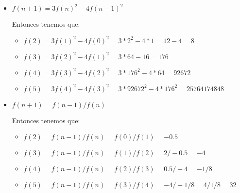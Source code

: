 \documentclass[12pt, fleqn]{article}                            %
\theoremstyle{break}                                            %
\begin{document}
\begin{itemize}
\begin{itemize}
            \end{itemize}

        \item $f(n + 1) = 3f(n)^2 - 4f(n - 1)^2$
        
            Entonces tenemos que:
            \begin{itemize}
            
                \item $f(2) 
                            = 3f(1)^2 - 4f(0)^2
                            = 3*2^2 - 4*1
                            = 12 - 4
                            = 8
                    $

                \item $f(3) 
                            = 3f(2)^2 - 4f(1)^2
                            = 3*64- 16
                            = 176
                    $

                \item $f(4) 
                            = 3f(3)^2 - 4f(2)^2
                            = 3*176^2 - 4*64
                            = 92672
                    $

                \item $f(5) 
                            = 3f(4)^2 - 4f(3)^2
                            = 3*92672^2 - 4*176^2
                            = 25764174848
                    $
            
            \end{itemize}

        \item $f(n + 1) = f(n - 1) / f(n)$
        
            Entonces tenemos que:
            \begin{itemize}
            
                \item $f(2) 
                            = f(n - 1) / f(n)
                            = f(0) / f(1)
                            = -0.5
                    $

                \item $f(3) 
                            = f(n - 1) / f(n)
                            = f(1) / f(2)
                            = 2 / -0.5
                            = -4
                    $

                \item $f(4) 
                            = f(n - 1) / f(n)
                            = f(2) / f(3)
                            = 0.5 / -4
                            = -1/8
                    $

                \item $f(5) 
                            = f(n - 1) / f(n)
                            = f(3) / f(4)
                            = -4 / -1/8
                            = 4 /1/8
                            = 32
                    $
            
            \end{itemize}

    \end{itemize}
\end{document}
